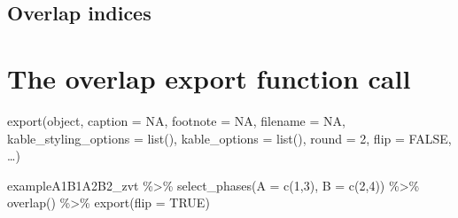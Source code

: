 \documentclass[
  letterpaper,
  DIV=11,
  numbers=noendperiod]{scrreprt}
\newenvironment{Shaded}{\begin{snugshade}}{\end{snugshade}}
\newcommand{\AttributeTok}[1]{\textcolor[rgb]{0.40,0.45,0.13}{#1}}
\newcommand{\ConstantTok}[1]{\textcolor[rgb]{0.56,0.35,0.01}{#1}}
\newcommand{\DecValTok}[1]{\textcolor[rgb]{0.68,0.00,0.00}{#1}}
\newcommand{\FunctionTok}[1]{\textcolor[rgb]{0.28,0.35,0.67}{#1}}
\newcommand{\NormalTok}[1]{\textcolor[rgb]{0.00,0.23,0.31}{#1}}
\newcommand{\SpecialCharTok}[1]{\textcolor[rgb]{0.37,0.37,0.37}{#1}}
\begin{document}
\hypertarget{overlap-indices}{%
\section{Overlap indices}\label{overlap-indices}}

\begin{tcolorbox}[enhanced jigsaw, breakable, rightrule=.15mm, bottomrule=.15mm, arc=.35mm, colback=white, colframe=quarto-callout-tip-color-frame, opacityback=0, leftrule=.75mm, toprule=.15mm, left=2mm]
\begin{minipage}[t]{5.5mm}
\textcolor{quarto-callout-tip-color}{\faLightbulb}
\end{minipage}%
\begin{minipage}[t]{\textwidth - 5.5mm}


\hypertarget{the-overlap-export-function-call}{%
\chapter{The overlap export function
call}\label{the-overlap-export-function-call}}

export(object, caption = NA, footnote = NA, filename = NA,
kable\_styling\_options = list(), kable\_options = list(), round = 2,
flip = FALSE, \ldots)

\end{minipage}%
\end{tcolorbox}

\begin{Shaded}
\begin{Highlighting}[]
\NormalTok{exampleA1B1A2B2\_zvt }\SpecialCharTok{\%\textgreater{}\%}
  \FunctionTok{select\_phases}\NormalTok{(}\AttributeTok{A =} \FunctionTok{c}\NormalTok{(}\DecValTok{1}\NormalTok{,}\DecValTok{3}\NormalTok{), }\AttributeTok{B =} \FunctionTok{c}\NormalTok{(}\DecValTok{2}\NormalTok{,}\DecValTok{4}\NormalTok{)) }\SpecialCharTok{\%\textgreater{}\%}
  \FunctionTok{overlap}\NormalTok{() }\SpecialCharTok{\%\textgreater{}\%}
  \FunctionTok{export}\NormalTok{(}\AttributeTok{flip =} \ConstantTok{TRUE}\NormalTok{)}
\end{Highlighting}
\end{Shaded}
\end{document}
